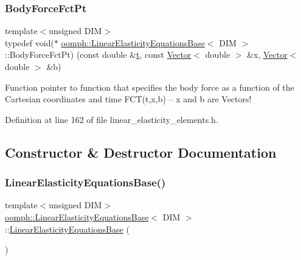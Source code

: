 \subsubsection{\texorpdfstring{Body\+Force\+Fct\+Pt}{BodyForceFctPt}}
{\footnotesize\ttfamily template$<$unsigned D\+IM$>$ \\
typedef void($\ast$ \hyperlink{classoomph_1_1LinearElasticityEquationsBase}{oomph\+::\+Linear\+Elasticity\+Equations\+Base}$<$ D\+IM $>$\+::Body\+Force\+Fct\+Pt) (const double \&\hyperlink{cfortran_8h_af6f0bd3dc13317f895c91323c25c2b8f}{t}, const \hyperlink{classoomph_1_1Vector}{Vector}$<$ double $>$ \&x, \hyperlink{classoomph_1_1Vector}{Vector}$<$ double $>$ \&b)}



Function pointer to function that specifies the body force as a function of the Cartesian coordinates and time F\+C\+T(t,x,b) -- x and b are Vectors! 



Definition at line 162 of file linear\+\_\+elasticity\+\_\+elements.\+h.



\subsection{Constructor \& Destructor Documentation}
\mbox{\label{classoomph_1_1LinearElasticityEquationsBase_af8288b11bc988ad9ef413ea9bee5d535}} 
\subsubsection{\texorpdfstring{Linear\+Elasticity\+Equations\+Base()}{LinearElasticityEquationsBase()}}
{\footnotesize\ttfamily template$<$unsigned D\+IM$>$ \\
\hyperlink{classoomph_1_1LinearElasticityEquationsBase}{oomph\+::\+Linear\+Elasticity\+Equations\+Base}$<$ D\+IM $>$\+::\hyperlink{classoomph_1_1LinearElasticityEquationsBase}{Linear\+Elasticity\+Equations\+Base} (\begin{DoxyParamCaption}{ }\end{DoxyParamCaption})\hspace{0.3cm}{\ttfamily [inline]}}



